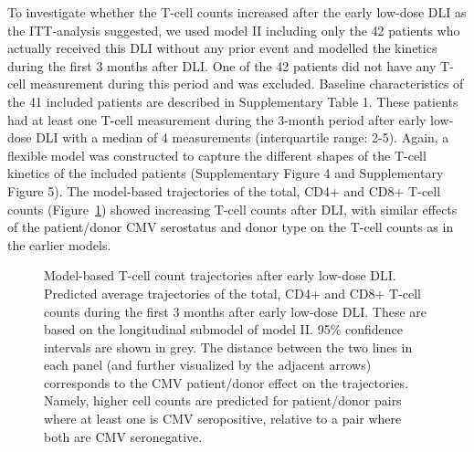 \documentclass[
  letterpaper,
  DIV=11,
  numbers=noendperiod]{scrreprt}
\begin{document}
To investigate whether the T-cell counts increased after the early
low-dose DLI as the ITT-analysis suggested, we used model II including
only the 42 patients who actually received this DLI without any prior
event and modelled the kinetics during the first 3 months after DLI. One
of the 42 patients did not have any T-cell measurement during this
period and was excluded. Baseline characteristics of the 41 included
patients are described in Supplementary Table 1. These patients had at
least one T-cell measurement during the 3-month period after early
low-dose DLI with a median of 4 measurements (interquartile range: 2-5).
Again, a flexible model was constructed to capture the different shapes
of the T-cell kinetics of the included patients (Supplementary Figure 4
and Supplementary Figure 5). The model-based trajectories of the total,
CD4+ and CD8+ T-cell counts (Figure~\ref{fig-DLI-four}) showed
increasing T-cell counts after DLI, with similar effects of the
patient/donor CMV serostatus and donor type on the T-cell counts as in
the earlier models.

\begin{figure}


\caption{\label{fig-DLI-four}Model-based T-cell count trajectories after
early low-dose DLI. Predicted average trajectories of the total, CD4+
and CD8+ T-cell counts during the first 3 months after early low-dose
DLI. These are based on the longitudinal submodel of model II. 95\%
confidence intervals are shown in grey. The distance between the two
lines in each panel (and further visualized by the adjacent arrows)
corresponds to the CMV patient/donor effect on the trajectories. Namely,
higher cell counts are predicted for patient/donor pairs where at least
one is CMV seropositive, relative to a pair where both are CMV
seronegative.}

\end{figure}%
\end{document}
